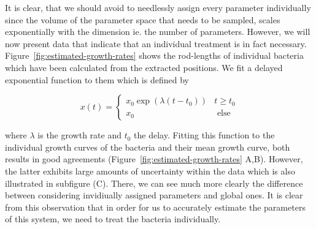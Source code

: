 \documentclass{article}
\begin{document}
It is clear, that we should avoid to needlessly assign every parameter individually since the volume
of the parameter space that needs to be sampled, scales exponentially with the dimension ie. the
number of parameters.
However, we will now present data that indicate that an individual treatment is in fact necessary.
Figure~\ref{fig:estimated-growth-rates} shows the rod-lengths of individual bacteria which have been
calculated from the extracted positions.
We fit a delayed exponential function to them which is defined by

\begin{equation}
    x(t) =
    \left\{\begin{array}{ll}
            x_0 \exp(\lambda (t-t_0)) & t\geq t_0\\
            x_0 & \text{ else}
    \end{array}\right.
\end{equation}

where $\lambda$ is the growth rate and $t_0$ the delay.
Fitting this function to the individual growth curves of the bacteria and their mean growth curve,
both results in good agreements (Figure~\ref{fig:estimated-growth-rates} A,B).
However, the latter exhibits large amounts of uncertainty within the data which is also illustrated
in subfigure (C).
There, we can see much more clearly the difference between considering invidiually assigned
parameters and global ones.
It is clear from this observation that in order for us to accurately estimate the parameters of this
system, we need to treat the bacteria individually.

\end{document}
